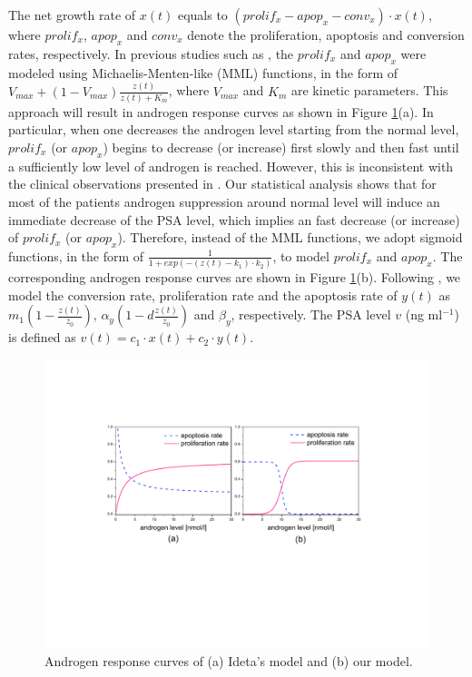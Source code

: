 The net growth rate of $x(t)$ equals to $(prolif_{x}-apop_{x}-conv_{x})\cdot x(t)$, where $prolif_x$, $apop_x$ and $conv_x$ denote the proliferation, apoptosis and conversion rates, respectively. In previous studies such as \cite{jackson04a,jackson04b,ideta08}, the $prolif_x$ and $apop_x$ were modeled using Michaelis-Menten-like (MML) functions, in the form of $V_{max}+(1-V_{max})\frac{z(t)}{z(t)+K_{m}}$, where $V_{max}$ and $K_m$ are kinetic parameters. This approach will result in androgen response curves as shown in Figure \ref{response}(a). In particular, when one decreases the androgen level starting from the normal level, $prolif_x$ (or $apop_x$) begins to decrease (or increase) first slowly and then fast until a sufficiently low level of androgen is reached. However, this is inconsistent with the clinical observations presented in \cite{bruchovsky06, bruchovsky07}. Our statistical analysis shows that for most of the patients androgen suppression around normal level will induce an immediate decrease of the PSA level, which implies an fast decrease (or increase) of $prolif_x$ (or $apop_x$). Therefore, instead of the MML functions, we adopt sigmoid functions, in the form of  $\frac{1}{1+exp(-(z(t)-k_1)\cdot k_2)}$, to model $prolif_x$ and $apop_x$. The corresponding androgen response curves are shown in Figure \ref{response}(b). Following \cite{ideta08}, we model the conversion rate, proliferation rate and the apoptosis rate of $y(t)$ as $m_1(1-\frac{z(t)}{z_0})$, $\alpha_y(1-d\frac{z(t)}{z_0})$ and $\beta_y$, respectively. The PSA level $v$ (ng ml$^{-1}$) is defined as $v(t)=c_1\cdot x(t)+c_2\cdot y(t)$. 

\begin{figure}[htb]
\centering
\includegraphics[scale=0.5]{fig-response}
\caption{Androgen response curves of (a) Ideta's model and (b) our model.}
\label{response}
\end{figure}




